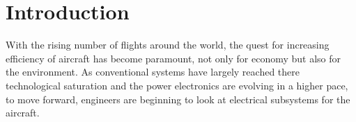 \documentclass[english]{kththesis}
\begin{document}
\mainmatter

\renewcommand{\chaptermark}[1]{\markboth{#1}{}}
\chapter{Introduction}
\label{ch:introduction}

%  
%
%

%

With the rising number of flights around the world, the quest for increasing efficiency of aircraft has become paramount, not only for economy but also for the environment. As conventional systems have largely reached there technological saturation and the power electronics are evolving in a higher pace, to move forward, engineers are beginning to look at electrical subsystems for the aircraft.
\end{document}
